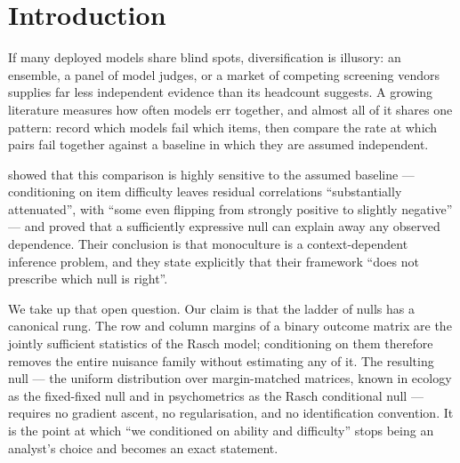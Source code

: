 \documentclass[pdflatex,sn-mathphys-ay]{sn-jnl}
\theoremstyle{thmstyleone}
\theoremstyle{thmstylethree}
\begin{document}
\section{Introduction}

If many deployed models share blind spots, diversification is illusory: an ensemble, a panel of
model judges, or a market of competing screening vendors supplies far less independent evidence
than its headcount suggests. A growing literature measures how often models err together, and
almost all of it shares one pattern: record which models fail which items, then compare the
rate at which pairs fail together against a baseline in which they are assumed independent.

\citet{jo2026subjectivity} showed that this comparison is highly sensitive to the assumed
baseline --- conditioning on item difficulty leaves residual correlations ``substantially
attenuated'', with ``some even flipping from strongly positive to slightly negative'' --- and
proved that a sufficiently expressive null can explain away any observed dependence. Their
conclusion is that monoculture is a context-dependent inference problem, and they state
explicitly that their framework ``does not prescribe which null is right''.

We take up that open question. Our claim is that the ladder of nulls has a canonical rung. The
row and column margins of a binary outcome matrix are the jointly sufficient statistics of the
Rasch model; conditioning on them therefore removes the entire nuisance family without
estimating any of it. The resulting null --- the uniform distribution over margin-matched
matrices, known in ecology as the fixed-fixed null and in psychometrics as the Rasch conditional
null --- requires no gradient ascent, no regularisation, and no identification convention. It is
the point at which ``we conditioned on ability and difficulty'' stops being an analyst's choice
and becomes an exact statement.
\end{document}
